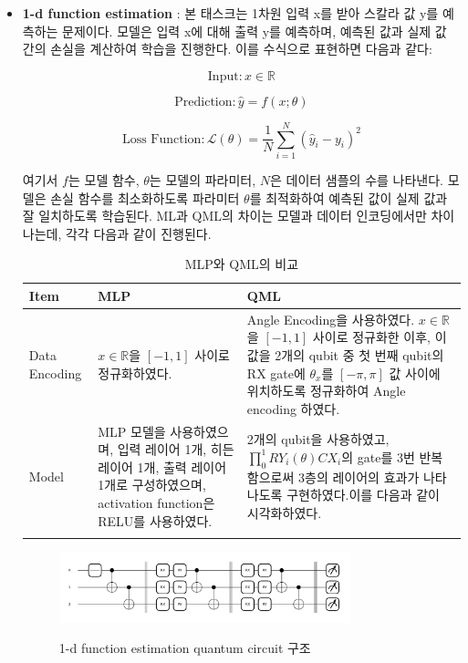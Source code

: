 \begin{itemize}
        \item \textbf{1-d function estimation} :
본 태스크는 1차원 입력 x를 받아 스칼라 값 y를 예측하는 문제이다. 모델은 입력 x에 대해 출력 y를 예측하며, 예측된 값과 실제 값 간의 손실을 계산하여 학습을 진행한다. 이를 수식으로 표현하면 다음과 같다:

\[
\text{Input}: x \in \mathbb{R}
\]

\[
\text{Prediction}: \hat{y} = f(x; \theta)
\]

\[
\text{Loss Function}: \mathcal{L}(\theta) = \frac{1}{N} \sum_{i=1}^{N} (\hat{y}_i - y_i)^2
\]

여기서 \(f\)는 모델 함수, \(\theta\)는 모델의 파라미터, \(N\)은 데이터 샘플의 수를 나타낸다. 모델은 손실 함수를 최소화하도록 파라미터 \(\theta\)를 최적화하여 예측된 값이 실제 값과 잘 일치하도록 학습된다. ML과 QML의 차이는 모델과 데이터 인코딩에서만 차이나는데, 각각 다음과 같이 진행된다.


\begin{table}[ht]
    \centering
    \begin{tabular}{ l||p{5.5cm}||p{5.5cm}}
    \Xhline{3\arrayrulewidth}
    \textbf{Item} & \textbf{MLP} & \textbf{QML} \\
    \hline
    Data Encoding & $x \in \mathbb{R}$을 $[-1, 1]$ 사이로 정규화하였다. &
    Angle Encoding을 사용하였다. $x \in \mathbb{R}$을 $[-1, 1]$ 사이로 정규화한 이후, 이 값을 2개의 qubit 중 첫 번째 qubit의 RX gate에 $\theta_x$를 $[-\pi, \pi]$ 값 사이에 위치하도록 정규화하여 Angle encoding 하였다. \\
    \hline
    Model & MLP 모델을 사용하였으며, 입력 레이어 1개, 히든 레이어 1개, 출력 레이어 1개로 구성하였으며, activation function은 RELU를 사용하였다. &
    2개의 qubit을 사용하였고, $\prod_{0}^{1} RY_i(\theta)CX_i$의 gate를 3번 반복함으로써 3층의 레이어의 효과가 나타나도록 구현하였다.이를 다음과 같이 시각화하였다.{fig:1d-image} \\
    \Xhline{3\arrayrulewidth}
    \end{tabular}
    \caption{MLP와 QML의 비교}
    \label{tab:mlp_qml_comparison_1d}
\end{table}

\begin{figure}[h]
    \centering
    \includegraphics[width=0.8\textwidth]{figs/pqc_1d}\
\caption{1-d function estimation quantum circuit 구조}
\label{fig:1d-image}
\end{figure}
\end{itemize}
\clearpage


